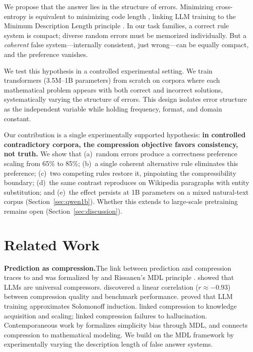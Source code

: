 \documentclass{article}
\begin{document}
We propose that the answer lies in the structure of errors. Minimizing cross-entropy is equivalent to minimizing code length \citep{shannon1948mathematical,deletang2024language}, linking LLM training to the Minimum Description Length principle \citep{rissanen1978modeling,grunwald2007minimum}. In our task families, a correct rule system is compact; diverse random errors must be memorized individually. But a \emph{coherent} false system---internally consistent, just wrong---can be equally compact, and the preference vanishes.

We test this hypothesis in a controlled experimental setting. We train transformers (3.5M--1B parameters) from scratch on corpora where each mathematical problem appears with both correct and incorrect solutions, systematically varying the structure of errors. This design isolates error structure as the independent variable while holding frequency, format, and domain constant.

Our contribution is a single experimentally supported hypothesis: \textbf{in controlled contradictory corpora, the compression objective favors consistency, not truth.} We show that (a)~random errors produce a correctness preference scaling from 65\% to 85\%; (b)~a single coherent alternative rule eliminates this preference; (c)~two competing rules restore it, pinpointing the compressibility boundary; (d)~the same contrast reproduces on Wikipedia paragraphs with entity substitution; and (e)~the effect persists at 1B parameters on a mixed natural-text corpus (Section~\ref{sec:qwen1b}). Whether this extends to large-scale pretraining remains open (Section~\ref{sec:discussion}).

\section{Related Work}

\textbf{Prediction as compression.}\quad The link between prediction and compression traces to \citet{shannon1948mathematical} and was formalized by \citet{solomonoff1964formal} and Rissanen's MDL principle \citep{rissanen1978modeling,grunwald2007minimum}. \citet{deletang2024language} showed that LLMs are universal compressors. \citet{huang2024compression} discovered a linear correlation ($r \approx -0.93$) between compression quality and benchmark performance. \citet{wan2025large} proved that LLM training approximates Solomonoff induction. \citet{pan2025understanding} linked compression to knowledge acquisition and scaling; \citet{chlon2025predictable} linked compression failures to hallucination. Contemporaneous work by \citet{marty2026compression} formalizes simplicity bias through MDL, and \citet{aksenov2026compression} connects compression to mathematical modeling. We build on the MDL framework by experimentally varying the description length of false answer systems.
\end{document}

